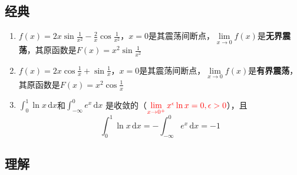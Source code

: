 \documentclass[a4paper,12pt]{article}
\begin{document}
    \subsection{经典}

    \begin{enumerate}
        \item $f(x) = 2x\sin \displaystyle\frac{1}{x^2} - \displaystyle\frac{2}{x}\cos \displaystyle\frac{1}{x^2}$，$x = 0$是其震荡间断点，$\lim\limits_{x\to 0} f(x)$是\textbf{无界震荡}，其原函数是$F(x) = x^2 \sin \displaystyle\frac{1}{x^2}$
        \item $f(x) = 2x\cos \displaystyle\frac{1}{x} + \sin \displaystyle\frac{1}{x}$，$x = 0$是其震荡间断点，$\lim\limits_{x\to 0} f(x)$是\textbf{有界震荡}，其原函数是$F(x) = x^2\cos \displaystyle\frac{1}{x}$
        \item $\int_0^1 \ln x\,\mathrm{d}x$和$\int_{-\infty}^0 e^x\,\mathrm{d}x$ 是收敛的（$\color{red}{\lim\limits_{x\to 0^+} x^{\epsilon}\ln x = 0, \epsilon > 0}$），且
        \[
            \int_0^1 \ln x\,\mathrm{d}x = -\int_{-\infty}^0 e^x\,\mathrm{d}x = -1
        \]
    \end{enumerate}

    \subsection{理解}
\end{document}
